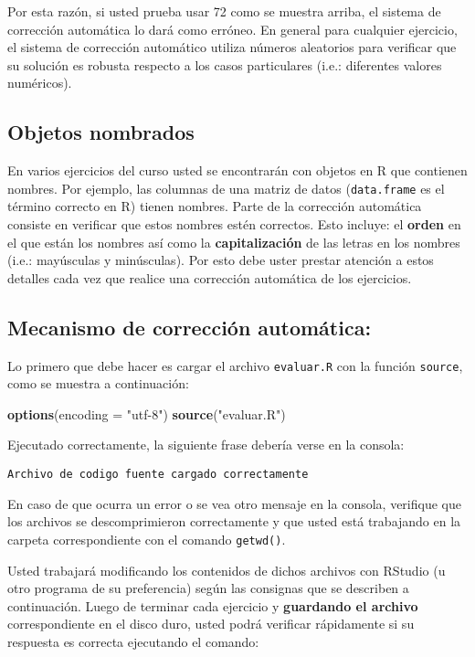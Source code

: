 \documentclass[]{article}
\newenvironment{Shaded}{}{}
\newcommand{\KeywordTok}[1]{\textcolor[rgb]{0.00,0.44,0.13}{\textbf{{#1}}}}
\newcommand{\DataTypeTok}[1]{\textcolor[rgb]{0.56,0.13,0.00}{{#1}}}
\newcommand{\StringTok}[1]{\textcolor[rgb]{0.25,0.44,0.63}{{#1}}}
\newcommand{\NormalTok}[1]{{#1}}
\begin{document}
Por esta razón, si usted prueba usar 72 como se muestra arriba, el
sistema de corrección automática lo dará como erróneo. En general para
cualquier ejercicio, el sistema de corrección automático utiliza números
aleatorios para verificar que su solución es robusta respecto a los
casos particulares (i.e.: diferentes valores numéricos).

\subsection{Objetos nombrados}

En varios ejercicios del curso usted se encontrarán con objetos en R que
contienen nombres. Por ejemplo, las columnas de una matriz de datos
(\texttt{data.frame} es el término correcto en R) tienen nombres. Parte
de la corrección automática consiste en verificar que estos nombres
estén correctos. Esto incluye: el \textbf{orden} en el que están los
nombres así como la \textbf{capitalización} de las letras en los nombres
(i.e.: mayúsculas y minúsculas). Por esto debe uster prestar atención a
estos detalles cada vez que realice una corrección automática de los
ejercicios.

\subsection{Mecanismo de corrección automática:}

Lo primero que debe hacer es cargar el archivo \texttt{evaluar.R} con la
función \texttt{source}, como se muestra a continuación:

\begin{Shaded}
\begin{Highlighting}[]
\KeywordTok{options}\NormalTok{(}\DataTypeTok{encoding =} \StringTok{"utf-8"}\NormalTok{)}
\KeywordTok{source}\NormalTok{(}\StringTok{"evaluar.R"}\NormalTok{)}
\end{Highlighting}
\end{Shaded}
Ejecutado correctamente, la siguiente frase debería verse en la consola:

\begin{verbatim}
Archivo de codigo fuente cargado correctamente
\end{verbatim}
En caso de que ocurra un error o se vea otro mensaje en la consola,
verifique que los archivos se descomprimieron correctamente y que usted
está trabajando en la carpeta correspondiente con el comando
\texttt{getwd()}.

Usted trabajará modificando los contenidos de dichos archivos con
RStudio (u otro programa de su preferencia) según las consignas que se
describen a continuación. Luego de terminar cada ejercicio y
\textbf{guardando el archivo} correspondiente en el disco duro, usted
podrá verificar rápidamente si su respuesta es correcta ejecutando el
comando:
\end{document}
